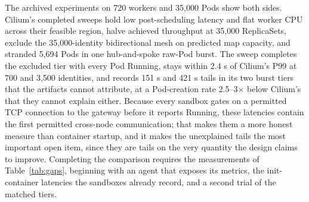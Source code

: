 The archived experiments on 720 workers and 35,000 Pods show both
sides. Cilium's completed sweeps hold low post-scheduling latency and
flat worker CPU across their feasible region, halve achieved throughput
at 35,000 ReplicaSets, exclude the 35,000-identity bidirectional mesh
on predicted map capacity, and stranded 5,694 Pods in one hub-and-spoke
raw-Pod burst. The \sys{} sweep completes the excluded tier with every
Pod Running, stays within 2.4 s of Cilium's P99 at 700 and 3,500
identities, and records 151 s and 421 s tails in its two burst tiers
that the artifacts cannot attribute, at a Pod-creation rate
2.5--3$\times$ below Cilium's that they cannot explain either. Because
every sandbox gates on a permitted TCP connection to the gateway before
it reports Running, these latencies contain the first permitted
cross-node communication; that makes them a more honest measure than
container startup, and it makes the unexplained tails the most
important open item, since they are tails on the very quantity the
design claims to improve. Completing the comparison requires the
measurements of Table~\ref{tab:gaps}, beginning with an agent that
exposes its metrics, the init-container latencies the sandboxes already
record, and a second trial of the matched tiers.

